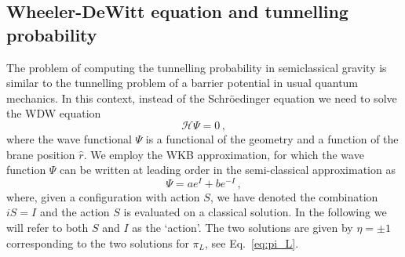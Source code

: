 \documentclass[11pt,a4paper]{article}
\begin{document}
\subsection{Wheeler-DeWitt equation and tunnelling probability}
\label{sec:TunnellingProbability}

The problem of computing the tunnelling probability in semiclassical gravity is similar to the tunnelling problem of a barrier potential in usual quantum mechanics. In this context, instead of the Schr\"oedinger equation we need to solve the WDW equation
\begin{equation}
\label{eq:WDW}
\mathcal{H} \Psi = 0 \,,
\end{equation}
where the wave functional $\Psi$ is a functional of the geometry and a function of the brane position $\hat r$. We employ the WKB approximation, for which the wave function $\Psi$ can be written at leading order in the semi-classical approximation as
\begin{equation}
\label{eq:GeneralWF}
\Psi = a e^{I} + b e^{- I} \,,
\end{equation}
where, given a configuration with action $S$, we have denoted the combination $iS = I$ and the action $S$ is evaluated on a classical solution. In the following we will refer to both $S$ and $I$ as the `action'. The two solutions are given by $\eta = \pm 1$ corresponding to the two solutions for $\pi_L$, see Eq.~\eqref{eq:pi_L}.
\end{document}
